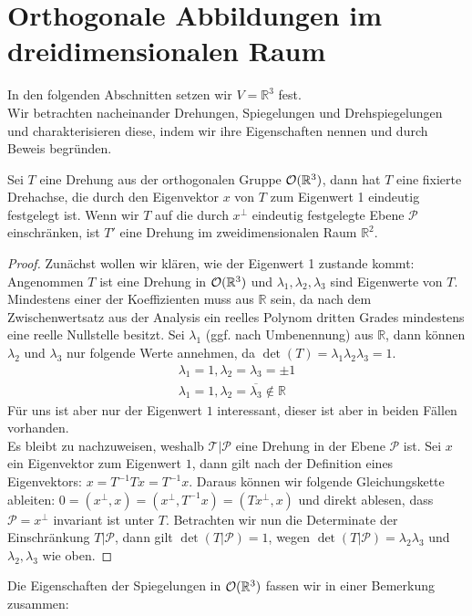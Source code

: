 \section{Orthogonale Abbildungen im dreidimensionalen Raum}
In den folgenden Abschnitten setzen wir $V= \mathbb{R}^3$ fest.\\
Wir betrachten nacheinander Drehungen, Spiegelungen und Drehspiegelungen und charakterisieren diese, indem wir ihre Eigenschaften nennen und durch Beweis begründen. 
\begin{theorem}
Sei $T$ eine Drehung aus der orthogonalen Gruppe ${\mathcal{O}(\mathbb{R}^3)}$, dann hat $T$ eine fixierte Drehachse, die durch den Eigenvektor $x$ von $T$ zum Eigenwert 1 eindeutig festgelegt ist. 
Wenn wir $T$ auf die durch $x^{\perp}$ eindeutig festgelegte Ebene $\mathcal{P}$ einschränken, ist $T'$ eine Drehung im zweidimensionalen Raum $\mathbb{R}^2$. 
\end{theorem}
\begin{proof}
Zunächst wollen wir klären, wie der Eigenwert 1 zustande kommt:
 Angenommen $T$ ist eine Drehung in ${\mathcal{O}(\mathbb{R}^3)}$ und $\lambda_1,\lambda_2,\lambda_3$ sind Eigenwerte von $T$. Mindestens einer der Koeffizienten muss aus $\mathbb{R}$ sein, da nach dem Zwischenwertsatz aus der Analysis ein reelles Polynom dritten Grades mindestens eine reelle Nullstelle besitzt. Sei $\lambda_1$ (ggf. nach Umbenennung) aus $\mathbb{R}$, dann können $\lambda_2$ und $\lambda_3$ nur folgende Werte annehmen, da $\det(T)=\lambda_1\lambda_2\lambda_3=1$.
 \begin{align}
  \lambda_1=1, \lambda_2=\lambda_3=\pm1 \\
  \lambda_1=1, \lambda_2=\overline{\lambda_3}\notin \mathbb{R}
 \end{align}
Für uns ist aber nur der Eigenwert $1$ interessant, dieser ist aber in beiden Fällen vorhanden.\\
Es bleibt zu nachzuweisen, weshalb $\mathcal{T}|\mathcal{P}$ eine Drehung in der Ebene $\mathcal{P}$ ist.
Sei $x$ ein Eigenvektor zum Eigenwert $1$, dann gilt nach der Definition eines Eigenvektors: $x=T^{-1}Tx=T^{-1}x$. Daraus können wir folgende Gleichungskette ableiten: $0=(x^{\perp},x)=(x^{\perp},T^{-1}x)=(Tx^{\perp},x)$ und direkt ablesen, dass $\mathcal{P}=x^{\perp}$ invariant ist unter $T$. Betrachten wir nun die Determinate der Einschränkung $T|\mathcal{P}$, dann gilt $\det(T|\mathcal{P})=1$, wegen $\det(T|\mathcal{P}) = \lambda_2\lambda_3$ und $\lambda_2,\lambda_3$ wie oben.
\end{proof}
Die Eigenschaften der Spiegelungen in ${\mathcal{O}(\mathbb{R}^3)}$ fassen wir in einer Bemerkung zusammen:
